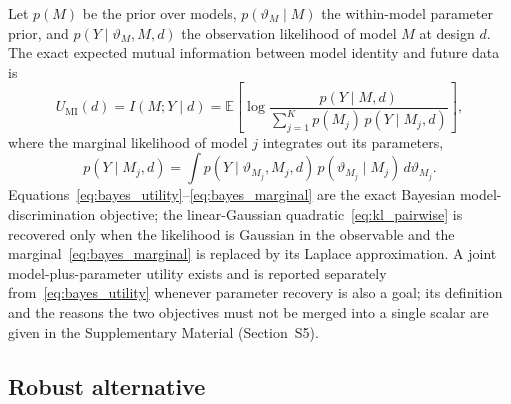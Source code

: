 Let $p(M)$ be the prior over models, $p(\vartheta_M \mid M)$ the within-model parameter prior, and $p(Y \mid \vartheta_M, M, d)$ the observation likelihood of model $M$ at design $d$. The exact expected mutual information between model identity and future data is
\begin{equation}
U_{\mathrm{MI}}(d)
= I(M;Y \mid d)
= \mathbb{E}\!\left[
\log \frac{p(Y \mid M, d)}{\sum_{j=1}^{K} p(M_j)\, p(Y \mid M_j, d)}
\right],
\label{eq:bayes_utility}
\end{equation}
where the marginal likelihood of model $j$ integrates out its parameters,
\begin{equation}
p(Y \mid M_j, d)
= \int p(Y \mid \vartheta_{M_j}, M_j, d)\, p(\vartheta_{M_j} \mid M_j)\, d\vartheta_{M_j}.
\label{eq:bayes_marginal}
\end{equation}
Equations~\eqref{eq:bayes_utility}--\eqref{eq:bayes_marginal} are the exact Bayesian model-discrimination objective; the linear-Gaussian quadratic~\eqref{eq:kl_pairwise} is recovered only when the likelihood is Gaussian in the observable and the marginal~\eqref{eq:bayes_marginal} is replaced by its Laplace approximation. A joint model-plus-parameter utility exists and is reported separately from~\eqref{eq:bayes_utility} whenever parameter recovery is also a goal; its definition and the reasons the two objectives must not be merged into a single scalar are given in the Supplementary Material (Section~S5).

\subsection{Robust alternative}

